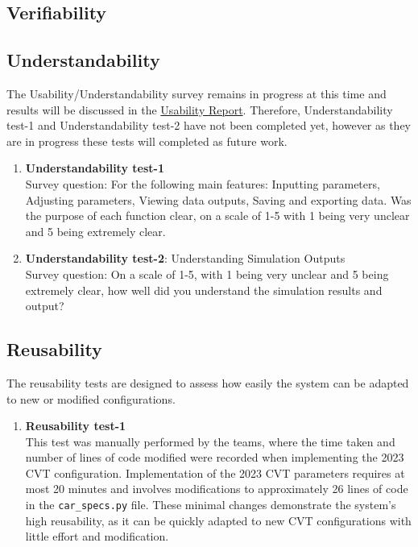 \documentclass[12pt, titlepage]{article}
\begin{document}
\subsection{Verifiability}

\subsection{Understandability}
The Usability/Understandability survey remains in progress at this time and results will be discussed in the \href{file:../UsabilityReport/UsabilityReport.pdf}{Usability Report}. 
Therefore, Understandability test-1 and Understandability test-2 have not been completed yet, however as they are in progress these tests will completed as future work. 

\begin{enumerate}
  \item{\textbf{Understandability test-1}}\\
  Survey question: For the following main features: Inputting parameters, Adjusting parameters, Viewing data outputs, Saving and exporting data. 
  Was the purpose of each function clear, on a scale of 1-5 with 1 being very unclear and 5 being extremely clear. 
  \item{\textbf{Understandability test-2}: Understanding Simulation Outputs}\\
  Survey question: On a scale of 1-5, with 1 being very unclear and 5 being extremely clear, how well did you understand the simulation results and output?
\end{enumerate}

\subsection{Reusability}

The reusability tests are designed to assess how easily the system can be adapted to new or modified configurations. 
\begin{enumerate}
    \item {\textbf{Reusability test-1}}\\
    This test was manually performed by the teams, where the time taken and number of lines of code modified were recorded when implementing the 2023 CVT configuration. 
    Implementation of the 2023 CVT parameters requires at most 20 minutes and involves modifications to approximately 26 lines of code in the \texttt{car\_specs.py} file. 
    These minimal changes demonstrate the system's high reusability, as it can be quickly adapted to new CVT configurations with little effort and modification.
\end{enumerate}
	
\end{document}
